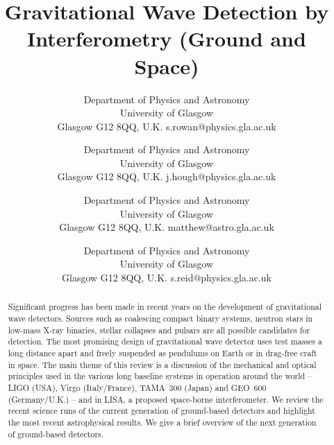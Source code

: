 \documentclass{article}
\begin{document}
\title{Gravitational Wave Detection by Interferometry (Ground and Space)}

\author{%
        {Department of Physics and Astronomy \\
        University of Glasgow \\
        Glasgow G12 8QQ, U.K.}
        {s.rowan@physics.gla.ac.uk}
	{}
\and
{}
        {Department of Physics and Astronomy \\
        University of Glasgow \\
        Glasgow G12 8QQ, U.K.}
        {j.hough@physics.gla.ac.uk}
	{}
\and
{}
        {Department of Physics and Astronomy \\
        University of Glasgow \\
        Glasgow G12 8QQ, U.K.}
        {matthew@astro.gla.ac.uk}
	{}
\and
{}
        {Department of Physics and Astronomy \\
        University of Glasgow \\
        Glasgow G12 8QQ, U.K.}
        {s.reid@physics.gla.ac.uk}
	{}
}

\date{}
\maketitle





\begin{abstract}
  Significant progress has been made in recent years on the development of
  gravitational wave detectors. Sources such as coalescing compact binary
  systems, neutron stars in low-mass X-ray binaries, stellar collapses and
  pulsars are all possible candidates for detection. The most promising design
  of gravitational wave detector uses test masses a long distance apart and
  freely suspended as pendulums on Earth or in drag-free craft in space.  The
  main theme of this review is a discussion of the mechanical and optical
  principles used in the various long baseline systems in operation around the
  world -- LIGO (USA), Virgo (Italy/France), TAMA~300 (Japan) and GEO~600
  (Germany/U.K.) -- and in LISA, a proposed space-borne interferometer. We
  review the recent science runs of the current generation of ground-based
  detectors and highlight the most recent astrophysical results. We give a
  brief overview of the next generation of ground-based detectors.
\end{abstract}
\end{document}
